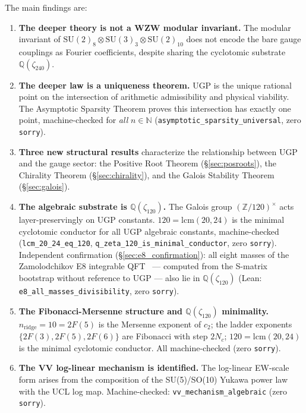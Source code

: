 \documentclass[11pt]{article}
\theoremstyle{remark}
\newcommand{\Nc}{N_c}
\newcommand{\zetaN}[1]{\zeta_{#1}}
\begin{document}
The main findings are:
\begin{enumerate}[leftmargin=2em]
  \item \textbf{The deeper theory is not a WZW modular invariant.}
    The modular invariant of $\mathrm{SU}(2)_8 \otimes \mathrm{SU}(3)_3 \otimes \mathrm{SU}(2)_{10}$
    does not encode the bare gauge couplings as Fourier coefficients, despite sharing
    the cyclotomic substrate $\mathbb{Q}(\zetaN{240})$.

  \item \textbf{The deeper law is a uniqueness theorem.}
    UGP is the unique rational point on the intersection of arithmetic admissibility
    and physical viability.
    The Asymptotic Sparsity Theorem proves this intersection has exactly one point,
    machine-checked for \emph{all} $n \in \mathbb{N}$
    (\texttt{asymptotic\_sparsity\_universal}, zero \texttt{sorry}).

  \item \textbf{Three new structural results} characterize the relationship between
    UGP and the gauge sector: the Positive Root Theorem (\S\ref{sec:posroots}),
    the Chirality Theorem (\S\ref{sec:chirality}), and the Galois Stability Theorem
    (\S\ref{sec:galois}).

  \item \textbf{The algebraic substrate is $\mathbb{Q}(\zetaN{120})$.}
    The Galois group $(\mathbb{Z}/120)^\times$ acts layer-preservingly on UGP constants.
    $120 = \mathrm{lcm}(20,24)$ is the minimal cyclotomic conductor for all UGP algebraic
    constants, machine-checked
    (\texttt{lcm\_20\_24\_eq\_120}, \texttt{q\_zeta\_120\_is\_minimal\_conductor},
    zero \texttt{sorry}).
    Independent confirmation (\S\ref{sec:e8_confirmation}): all eight masses of the
    Zamolodchikov E8 integrable QFT~\cite{Zamolodchikov1989,DelfinoMussardo1995}
    --- computed from the S-matrix bootstrap without reference to UGP ---
    also lie in $\mathbb{Q}(\zetaN{120})$
    (Lean: \texttt{e8\_all\_masses\_divisibility}, zero \texttt{sorry}).

  \item \textbf{The Fibonacci-Mersenne structure and $\mathbb{Q}(\zetaN{120})$ minimality.}
    $n_{\mathrm{ridge}} = 10 = 2F(5)$ is the Mersenne exponent of $c_2$; the ladder
    exponents $\{2F(3), 2F(5), 2F(6)\}$ are Fibonacci with step $2\Nc$;
    $120 = \mathrm{lcm}(20,24)$ is the minimal cyclotomic conductor.
    All machine-checked (zero \texttt{sorry}).

  \item \textbf{The VV log-linear mechanism is identified.}
    The log-linear EW-scale form arises from the composition of the SU(5)/SO(10)
    Yukawa power law with the UCL log map.
    Machine-checked: \texttt{vv\_mechanism\_algebraic} (zero \texttt{sorry}).


\end{enumerate}
\end{document}
